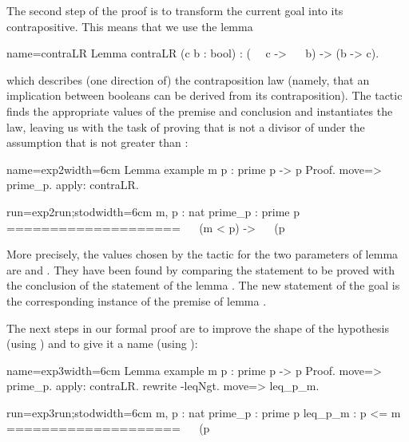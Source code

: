 The second step of the proof is to transform the current goal into its
contrapositive. This means that we use the lemma

\begin{coq}{name=contraLR}{}
Lemma contraLR (c b : bool) :  (~~ c -> ~~ b) -> (b -> c).
\end{coq}

which describes (one direction of) the contraposition law (namely,
that an implication between booleans can be derived from its
contraposition). The  tactic
finds the appropriate values of the premise and conclusion and
instantiates the law, leaving us with the task of proving
that  is not a
divisor of  under the assumption that  is not
greater than :

\begin{coq-left}{name=exp2}{width=6cm}
Lemma example m p : prime p ->
  p %
Proof.
move=> prime_p.
apply: contraLR.
\end{coq-left}
\begin{coqout-right}{run=exp2run;stod}{width=6cm}
m, p : nat
prime_p : prime p
====================
 ~~ (m < p) -> ~~ (p %
\end{coqout-right}

More precisely, the values chosen by the tactic for the two parameters
 of lemma  are  and
. They have been found by comparing the statement to be
proved with the conclusion  of the statement of the lemma
.
The new statement of the goal is the corresponding instance of the
premise  of lemma .

The next steps in our formal proof are to improve the shape of the
hypothesis  (using )
and to give it a name (using ):


\begin{coq-left}{name=exp3}{width=6cm}
Lemma example m p : prime p ->
  p %
Proof.
move=> prime_p.
apply: contraLR.
rewrite -leqNgt.
move=> leq_p_m.
\end{coq-left}
\begin{coqout-right}{run=exp3run;stod}{width=6cm}
m, p : nat
prime_p : prime p
leq_p_m :  p <= m
====================
 ~~ (p %
\end{coqout-right}

